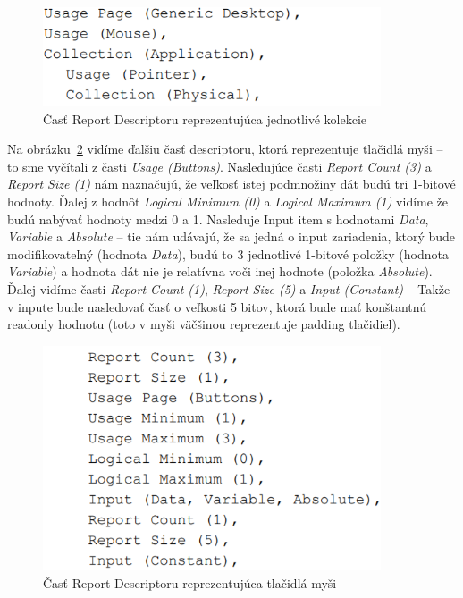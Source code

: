 \begin{figure}[!htb]
	\centering
	\includegraphics[width=10cm]{img/kap03_report_desc_collection}
	\caption{Časť Report Descriptoru reprezentujúca jednotlivé kolekcie}
	\label{obr:kap3:report_desc_collection}
\end{figure}

Na obrázku~\ref{obr:kap3:report_desc_buttons} vidíme ďalšiu časť descriptoru, ktorá reprezentuje tlačidlá myši -- to sme vyčítali z časti \textit{Usage (Buttons)}. Nasledujúce časti \textit{Report Count (3)} a \textit{Report Size (1)} nám naznačujú, že veľkosť istej podmnožiny dát budú tri 1-bitové hodnoty. Ďalej z hodnôt \textit{Logical Minimum (0)} a \textit{Logical Maximum (1)} vidíme že budú nabývať hodnoty medzi 0 a 1. Nasleduje Input item s hodnotami \textit{Data}, \textit{Variable} a \textit{Absolute} -- tie nám udávajú, že sa jedná o input zariadenia, ktorý bude modifikovateľný (hodnota \textit{Data}), budú to 3 jednotlivé 1-bitové položky (hodnota \textit{Variable}) a hodnota dát nie je relatívna voči inej hodnote (položka \textit{Absolute}). Ďalej vidíme časti \textit{Report Count (1)}, \textit{Report Size (5)} a \textit{Input (Constant)} -- Takže v inpute bude nasledovať časť o veľkosti 5 bitov, ktorá bude mať konštantnú readonly hodnotu (toto v myši väčšinou reprezentuje padding tlačidiel).

\begin{figure}[!htb]
	\centering
	\includegraphics[width=10cm]{img/kap03_report_desc_buttons}
	\caption{Časť Report Descriptoru reprezentujúca tlačidlá myši}
	\label{obr:kap3:report_desc_buttons}
\end{figure}


